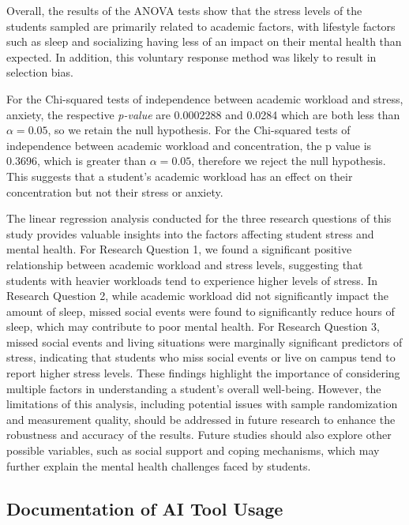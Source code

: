 \documentclass[
  letterpaper,
  DIV=11,
  numbers=noendperiod]{scrartcl}
\begin{document}
Overall, the results of the ANOVA tests show that the stress levels of
the students sampled are primarily related to academic factors, with
lifestyle factors such as sleep and socializing having less of an impact
on their mental health than expected. In addition, this voluntary
response method was likely to result in selection bias.

For the Chi-squared tests of independence between academic workload and
stress, anxiety, the respective \emph{p-value} are 0.0002288 and 0.0284
which are both less than \(\alpha=0.05\), so we retain the null
hypothesis. For the Chi-squared tests of independence between academic
workload and concentration, the p value is 0.3696, which is greater than
\(\alpha=0.05\), therefore we reject the null hypothesis. This suggests
that a student's academic workload has an effect on their concentration
but not their stress or anxiety.

The linear regression analysis conducted for the three research
questions of this study provides valuable insights into the factors
affecting student stress and mental health. For Research Question 1, we
found a significant positive relationship between academic workload and
stress levels, suggesting that students with heavier workloads tend to
experience higher levels of stress. In Research Question 2, while
academic workload did not significantly impact the amount of sleep,
missed social events were found to significantly reduce hours of sleep,
which may contribute to poor mental health. For Research Question 3,
missed social events and living situations were marginally significant
predictors of stress, indicating that students who miss social events or
live on campus tend to report higher stress levels. These findings
highlight the importance of considering multiple factors in
understanding a student's overall well-being. However, the limitations
of this analysis, including potential issues with sample randomization
and measurement quality, should be addressed in future research to
enhance the robustness and accuracy of the results. Future studies
should also explore other possible variables, such as social support and
coping mechanisms, which may further explain the mental health
challenges faced by students.

\subsection{Documentation of AI Tool
Usage}\label{documentation-of-ai-tool-usage}
\end{document}
